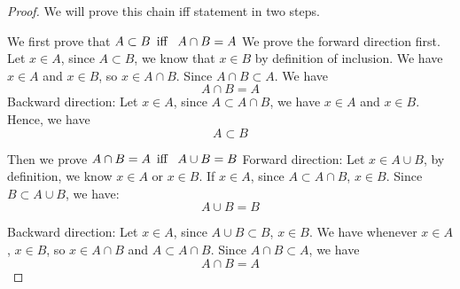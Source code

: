 \documentclass{book}
\begin{document}
            \begin{proof}
            We will prove this chain iff statement in two steps.
            
            We first prove that $A \subset B \hspace{5pt} \text{\normalfont iff } \hspace{5pt} A \cap B = A$
            We prove the forward direction first. 
            Let $x \in A$, since $A \subset B$, we know that $x \in B$ by definition of inclusion. We have $x \in A$ and $x \in B$, so $x \in A \cap B$. Since $A \cap B \subset A$. We have $$A \cap B = A$$
            Backward direction: 
            Let $x \in A$, since $A \subset A \cap B$, we have $x \in A$ and $x \in B$. Hence, we have $$A \subset B$$
            
            Then we prove $A \cap B = A \hspace{5pt} \text{\normalfont iff } \hspace{5pt} A \cup B = B$
            Forward direction: 
            Let $x \in A \cup B$, by definition, we know $x \in A$ or $x \in B$. If $x \in A$, since $A \subset A \cap B$, $x \in B$. Since $B \subset A \cup B$, we have: $$A \cup B = B$$
            
            Backward direction:
            Let $x \in A$, since $A \cup B \subset B$, $x \in B$. We have whenever $x \in A$, $x \in B$, so $x \in A \cap B$ and $A \subset A \cap B$. Since $A \cap B \subset A$, we have $$A \cap B = A$$
            \end{proof}            
            
\end{document}
